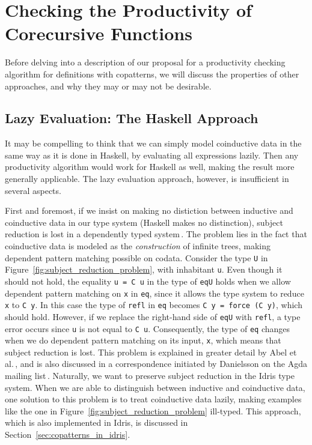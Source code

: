 \section{Checking the Productivity of Corecursive Functions}
\label{sec:productivity}

Before delving into a description of our proposal for a productivity checking algorithm for definitions with copatterns, we will discuss the properties of other approaches, and why they may or may not be desirable.

\subsection{Lazy Evaluation: The Haskell Approach}
It may be compelling to think that we can simply model coinductive data in the same way as it is done in Haskell, by evaluating all expressions lazily. Then any productivity algorithm would work for Haskell as well, making the result more generally applicable. The lazy evaluation approach, however, is insufficient in several aspects.

First and foremost, if we insist on making no distiction between inductive and coinductive data in our type system (Haskell makes no distinction), subject reduction is lost in a dependently typed system\,\citep{Abel13Copatterns}. The problem lies in the fact that coinductive data is modeled as the \emph{construction} of infinite trees, making dependent pattern matching possible on codata. Consider the type \texttt{U} in Figure~\ref{fig:subject_reduction_problem}, with inhabitant \texttt{u}. Even though it should not hold, the equality \texttt{u = C u} in the type of \texttt{eqU} holds when we allow dependent pattern matching on \texttt{x} in \texttt{eq}, since it allows the type system to reduce \texttt{x} to \texttt{C y}. In this case the type of \texttt{refl} in \texttt{eq} becomes \texttt{C y = force (C y)}, which should hold. However, if we replace the right-hand side of \texttt{eqU} with \texttt{refl}, a type error occurs since \texttt{u} is not equal to \texttt{C u}. Consequently, the type of \texttt{eq} changes when we do dependent pattern matching on its input, \texttt{x}, which means that subject reduction is lost. This problem is explained in greater detail by Abel et al.\,\citep{Abel13Copatterns}, and is also discussed in a correspondence initiated by Danielsson on the Agda mailing list\,\citep{OuryCounterexample}. Naturally, we want to preserve subject reduction in the Idris type system. When we are able to distinguish between inductive and coinductive data, one solution to this problem is to treat coinductive data lazily, making examples like the one in Figure~\ref{fig:subject_reduction_problem} ill-typed. This approach, which is also implemented in Idris, is discussed in Section~\ref{sec:copatterns_in_idris}.


